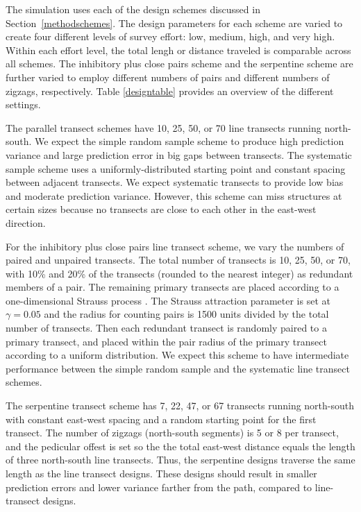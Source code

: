 \documentclass[review]{elsarticle}
\begin{document}
The simulation uses each of the design schemes discussed in
Section~\ref{methodschemes}. The design parameters for each scheme are varied
to create four different levels of survey effort: low, medium, high, and very
high. Within each effort level, the total lengh or distance traveled is
comparable across all schemes. The inhibitory plus close pairs scheme and the
serpentine scheme are further varied to employ different numbers of pairs
and different numbers of zigzags, respectively. Table \ref{designtable}
provides an overview of the different settings.

The parallel transect schemes have 10, 25, 50, or 70 line transects running
north-south. We expect the simple random sample scheme to produce high
prediction variance and large prediction error in big gaps between transects.
The systematic sample scheme uses a uniformly-distributed starting point and
constant spacing between adjacent transects. We expect systematic transects to
provide low bias and moderate prediction variance. However, this scheme can
miss structures at certain sizes because no transects are close to each other
in the east-west direction.

For the inhibitory plus close pairs line transect scheme, we vary the numbers of
paired and unpaired transects. The total number of transects is 10, 25, 50, or
70, with 10\% and 20\% of the transects (rounded to the nearest integer) as
redundant members of a pair. The remaining primary transects are placed
according to a one-dimensional Strauss process \citep{strauss,kellyripley}. The
Strauss attraction parameter is set at \(\gamma = 0.05\) and the radius for
counting pairs is 1500 units divided by the total number of transects. Then
each redundant transect is randomly paired to a primary transect, and placed
within the pair radius of the primary transect according to a uniform
distribution. We expect this scheme to have intermediate performance between
the simple random sample and the systematic line transect schemes.

The serpentine transect scheme has 7, 22, 47, or 67 transects running
north-south with constant east-west spacing and a random starting point for the
first transect. The number of zigzags (north-south segments) is 5 or 8 per
transect, and the pedicular offest is set so the the total east-west
distance equals the length of three north-south line transects. Thus, the
serpentine designs traverse the same length as the line transect designs. These
designs should result in smaller prediction errors and lower variance farther
from the path, compared to line-transect designs.
\end{document}
